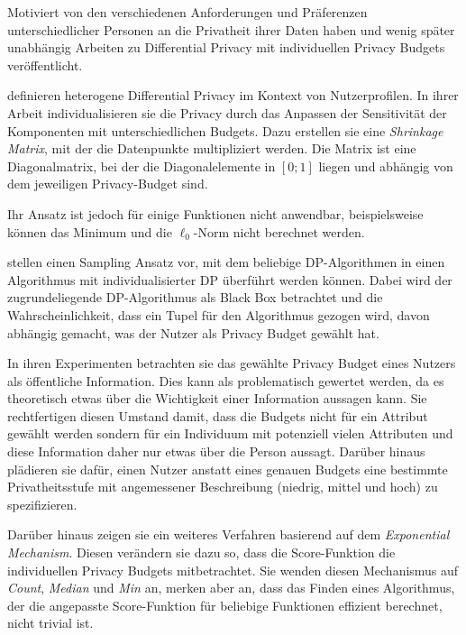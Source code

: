 Motiviert von den verschiedenen Anforderungen und Präferenzen unterschiedlicher Personen an die Privatheit ihrer Daten haben \textcite{alaggan:2016} und wenig später unabhängig \textcite{jorgensen:2015} Arbeiten zu Differential Privacy mit individuellen Privacy Budgets veröffentlicht.

\textcite{alaggan:2016} definieren heterogene Differential Privacy im Kontext von Nutzerprofilen. In ihrer Arbeit individualisieren sie die Privacy durch das Anpassen der Sensitivität der Komponenten mit unterschiedlichen Budgets. Dazu erstellen sie eine \textit{Shrinkage Matrix}, mit der die Datenpunkte multipliziert werden. Die Matrix ist eine Diagonalmatrix, bei der die Diagonalelemente in $[0;1]$ liegen und abhängig von dem jeweiligen Privacy-Budget sind.

Ihr Ansatz ist jedoch für einige Funktionen nicht anwendbar, beispielsweise können das Minimum und die $\ell_0$-Norm nicht berechnet werden.

\textcite{jorgensen:2015} stellen einen Sampling Ansatz vor, mit dem beliebige DP-Algorithmen in einen Algorithmus mit individualisierter DP überführt werden können. Dabei wird der zugrundeliegende DP-Algorithmus als Black Box betrachtet und die Wahrscheinlichkeit, dass ein Tupel für den Algorithmus gezogen wird, davon abhängig gemacht, was der Nutzer als Privacy Budget gewählt hat.

In ihren Experimenten betrachten sie das gewählte Privacy Budget eines Nutzers als öffentliche Information. Dies kann als problematisch gewertet werden, da es theoretisch etwas über die Wichtigkeit einer Information aussagen kann. Sie rechtfertigen diesen Umstand damit, dass die Budgets nicht für ein Attribut gewählt werden sondern für ein Individuum mit potenziell vielen Attributen und diese Information daher nur etwas über die Person aussagt. Darüber hinaus plädieren sie dafür, einen Nutzer anstatt eines genauen Budgets eine bestimmte Privatheitsstufe mit angemessener Beschreibung (niedrig, mittel und hoch) zu spezifizieren.

Darüber hinaus zeigen sie ein weiteres Verfahren basierend auf dem \textit{Exponential Mechanism}. Diesen verändern sie dazu so, dass die Score-Funktion die individuellen Privacy Budgets mitbetrachtet. Sie wenden diesen Mechanismus auf \textit{Count}, \textit{Median} und \textit{Min} an, merken aber an, dass das Finden eines Algorithmus, der die angepasste Score-Funktion für beliebige Funktionen effizient berechnet, nicht trivial ist.

